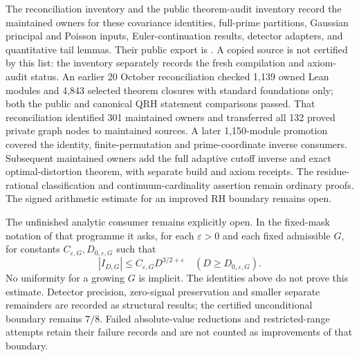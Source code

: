 \documentclass[11pt]{article}
\theoremstyle{definition}
\begin{document}
The reconciliation inventory
and the public theorem-audit inventory record the maintained owners
for these covariance identities, full-prime partitions, Gaussian
principal and Poisson inputs, Euler-continuation results, detector
adapters, and quantitative tail lemmas.
Their public export is
.
A copied source is not certified by this list: the inventory separately
records the fresh compilation and axiom-audit status.
An earlier 20 October reconciliation checked 1,139 owned Lean modules and
4,843 selected theorem closures with standard foundations only; both the
public and canonical QRH statement comparisons passed. That reconciliation
identified 301 maintained owners and transferred all 132 proved private
graph nodes to maintained sources. A later 1,150-module promotion covered
the identity, finite-permutation and prime-coordinate inverse consumers.
Subsequent maintained owners add the full adaptive cutoff inverse and
exact optimal-distortion theorem, with separate build and axiom receipts.
The residue-rational classification and continuum-cardinality assertion
remain ordinary proofs. The signed arithmetic estimate for an improved
RH boundary remains open.

The unfinished analytic consumer remains explicitly open. In the
fixed-mask notation of that programme it asks, for each
$\varepsilon>0$ and each fixed admissible $G$, for constants
$C_{\varepsilon,G},D_{0,\varepsilon,G}$ such that
\[
 |I_{D,G}|\le C_{\varepsilon,G}D^{3/2+\varepsilon}
 \quad(D\ge D_{0,\varepsilon,G}).
\]
No uniformity for a growing $G$ is implicit. The identities above do
not prove this estimate. Detector precision, zero-signal preservation
and smaller separate remainders are recorded as structural results;
the certified unconditional boundary remains $7/8$.
Failed absolute-value reductions and restricted-range attempts retain
their failure records and are not counted as improvements of that boundary.
\end{document}
